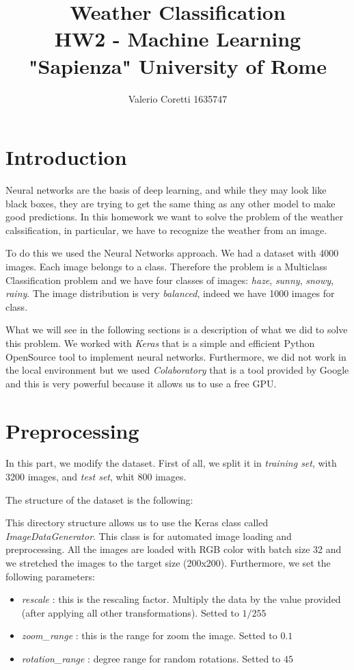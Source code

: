 \documentclass[12pt]{article}
\title{{\bf Weather Classification} \\ \bigskip \large HW2 - Machine Learning \\ \large "Sapienza" University of Rome}
\author{Valerio Coretti 1635747}
\begin{document}
\maketitle

\section{Introduction}
Neural networks are the basis of deep learning, and while they may look like black boxes, they are trying to get the same thing as any other model to make good predictions. In this homework we want to solve the problem of the {weather calssification}, in particular, we have to recognize the weather from an image.

To do this we used the Neural Networks approach. We had a dataset with 4000 images. Each image belongs to a class. Therefore the problem is a Multiclass Classification problem and we have four classes of images: {\em haze}, {\em sunny}, {\em snowy}, {\em rainy}. The image distribution is very {\em balanced}, indeed we have 1000 images for class.

What we will see in the following sections is a description of what we did to solve this problem. We worked with {\em Keras} that is a simple and efficient Python OpenSource tool to implement neural networks. Furthermore, we did not work in the local environment but we used {\em Colaboratory} that is a tool provided by Google and this is very powerful because it allows us to use a free GPU.

\section{Preprocessing}
In this part, we modify the dataset. First of all, we split it in {\em training set}, with 3200 images, and {\em test set}, whit 800 images.

The structure of the dataset is the following:

\bigskip
{}

This directory structure allows us to use the Keras class called {\em ImageDataGenerator}. This class is for automated image loading and preprocessing. All the images are loaded with RGB color with batch size 32 and we stretched the images to the target size (200x200). Furthermore, we set the following parameters:
\begin{itemize}
 \item {\em rescale} : this is the rescaling factor. Multiply the data by the value provided (after applying all other transformations). Setted to $1/255$
 \item {\em zoom\_range} : this is the range for zoom the image. Setted to $0.1$
 \item {\em rotation\_range} : degree range for random rotations. Setted to $45$
\end{itemize}
\end{document}
